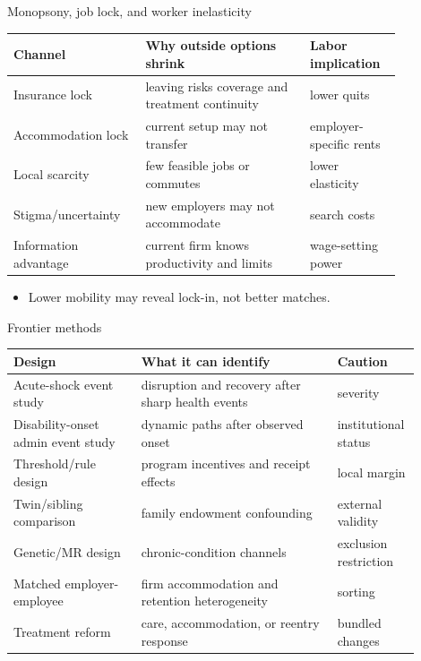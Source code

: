 \documentclass[aspectratio=169,11pt]{beamer}
\begin{document}
\begin{frame}{Monopsony, job lock, and worker inelasticity}
\small
\begin{tabular}{p{0.28\linewidth} p{0.38\linewidth} p{0.20\linewidth}}
\toprule
Channel & Why outside options shrink & Labor implication \\
\midrule
Insurance lock & leaving risks coverage and treatment continuity & lower quits \\
Accommodation lock & current setup may not transfer & employer-specific rents \\
Local scarcity & few feasible jobs or commutes & lower elasticity \\
Stigma/uncertainty & new employers may not accommodate & search costs \\
Information advantage & current firm knows productivity and limits & wage-setting power \\
\bottomrule
\end{tabular}
\vspace{0.25cm}
\begin{itemize}
    \item Lower mobility may reveal lock-in, not better matches.
\end{itemize}
\end{frame}

\begin{frame}{Frontier methods}
\small
\begin{tabular}{p{0.30\linewidth} p{0.46\linewidth} p{0.14\linewidth}}
\toprule
Design & What it can identify & Caution \\
\midrule
Acute-shock event study & disruption and recovery after sharp health events & severity \\
Disability-onset admin event study & dynamic paths after observed onset & institutional status \\
Threshold/rule design & program incentives and receipt effects & local margin \\
Twin/sibling comparison & family endowment confounding & external validity \\
Genetic/MR design & chronic-condition channels & exclusion restriction \\
Matched employer-employee & firm accommodation and retention heterogeneity & sorting \\
Treatment reform & care, accommodation, or reentry response & bundled changes \\
\bottomrule
\end{tabular}
\end{frame}
\end{document}
